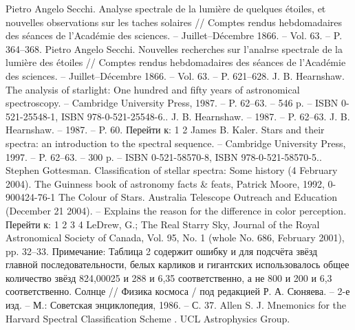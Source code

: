 \documentclass[12pt,a4paper]{article}
\begin{document}
\begin{thebibliography}{99}


  Pietro Angelo Secchi. Analyse spectrale de la lumière de quelques étoiles, et nouvelles observations sur les taches solaires  // Comptes rendus hebdomadaires des séances de l’Académie des sciences. -- Juillet--Décembre 1866. -- Vol. 63. -- P. 364--368.  
  Pietro Angelo Secchi. Nouvelles recherches sur l'analrse spectrale de la lumière des étoiles  // Comptes rendus hebdomadaires des séances de l’Académie des sciences. -- Juillet--Décembre 1866. -- Vol. 63. -- P. 621--628. 
  J. B. Hearnshaw. The analysis of starlight: One hundred and fifty years of astronomical spectroscopy. -- Cambridge University Press, 1987. -- P. 62--63. -- 546 p. -- ISBN 0-521-25548-1, ISBN 978-0-521-25548-6..
  J. B. Hearnshaw. -- 1987. -- P. 62--63.
  J. B. Hearnshaw. -- 1987. -- P. 60.
  Перейти к: 1 2 James B. Kaler. Stars and their spectra: an introduction to the spectral sequence. -- Cambridge University Press, 1997. -- P. 62--63. -- 300 p. -- ISBN 0-521-58570-8, ISBN 978-0-521-58570-5..  
  Stephen Gottesman. Classification of stellar spectra: Some history  (4 February 2004). 
  The Guinness book of astronomy facts \& feats, Patrick Moore, 1992, 0-900424-76-1
  The Colour of Stars. Australia Telescope Outreach and Education (December 21 2004). -- Explains the reason for the difference in color perception.
  Перейти к: 1 2 3 4 LeDrew, G.; The Real Starry Sky, Journal of the Royal Astronomical Society of Canada, Vol. 95, No. 1 (whole No. 686, February 2001), pp. 32–33. Примечание: Таблица 2 содержит ошибку и для подсчёта звёзд главной последовательности, белых карликов и гигантских использовалось общее количество звёзд 824,00025 и 288 и 6,35 соответственно, а не 800 и 200 и 6,3 соответственно.
  Солнце // Физика космоса / под редакцией Р. А. Сюняева. -- 2-е изд. -- М.: Советская энциклопедия, 1986. -- С. 37.
  Allen S. J. Mnemonics for the Harvard Spectral Classification Scheme . UCL Astrophysics Group. 
\end{thebibliography}
\end{document}
